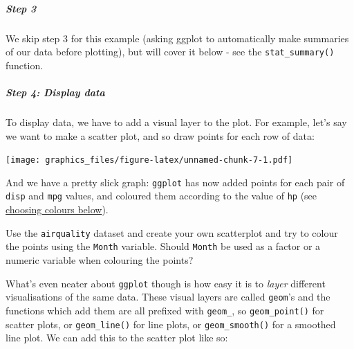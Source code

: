 \documentclass[]{article}
\newenvironment{Shaded}{\begin{snugshade}}{\end{snugshade}}
\newcommand{\DataTypeTok}[1]{\textcolor[rgb]{0.13,0.29,0.53}{#1}}
\newcommand{\DecValTok}[1]{\textcolor[rgb]{0.00,0.00,0.81}{#1}}
\newcommand{\KeywordTok}[1]{\textcolor[rgb]{0.13,0.29,0.53}{\textbf{#1}}}
\newcommand{\NormalTok}[1]{#1}
\newcommand{\OperatorTok}[1]{\textcolor[rgb]{0.81,0.36,0.00}{\textbf{#1}}}
\newcommand{\StringTok}[1]{\textcolor[rgb]{0.31,0.60,0.02}{#1}}
\let\oldsubparagraph\subparagraph
\renewcommand{\subparagraph}[1]{\oldsubparagraph{#1}\mbox{}}
\begin{document}
\hypertarget{step-3}{%
\subparagraph{Step 3}\label{step-3}}

We skip step 3 for this example (asking ggplot to automatically make summaries
of our data before plotting), but will cover it below - see the \texttt{stat\_summary()}
function.

\hypertarget{step-4-display-data}{%
\subparagraph{Step 4: Display data}\label{step-4-display-data}}

To display data, we have to add a visual layer to the plot. For example, let's
say we want to make a scatter plot, and so draw points for each row of data:

\begin{Shaded}
\end{Shaded}

\texttt{[image: graphics\_files/figure-latex/unnamed-chunk-7-1.pdf]}

And we have a pretty slick graph: \texttt{ggplot} has now added points for each pair of
\texttt{disp} and \texttt{mpg} values, and coloured them according to the value of \texttt{hp} (see
\protect\hyperlink{picking-colours}{choosing colours below}).

{Use the \texttt{airquality} dataset and create your own scatterplot and try to colour
the points using the \texttt{Month} variable. Should \texttt{Month} be used as a factor or a
numeric variable when colouring the points?}

What's even neater about \texttt{ggplot} though is how easy it is to \emph{layer} different
visualisations of the same data. These visual layers are called \texttt{geom}'s and the
functions which add them are all prefixed with \texttt{geom\_}, so \texttt{geom\_point()} for
scatter plots, or \texttt{geom\_line()} for line plots, or \texttt{geom\_smooth()} for a
smoothed line plot. We can add this to the scatter plot like so:

\begin{Shaded}
\end{Shaded}
\end{document}
